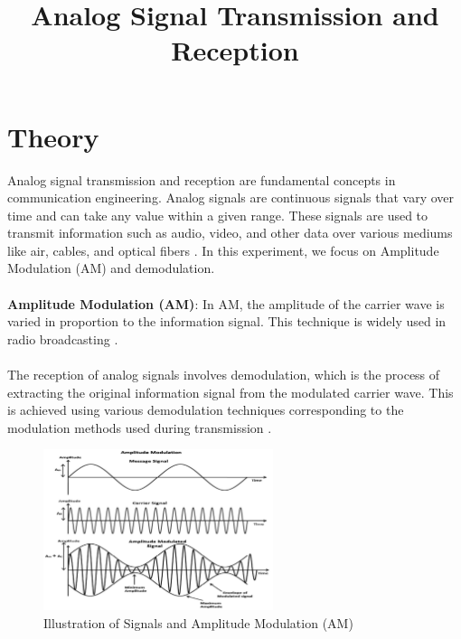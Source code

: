 \documentclass[12pt]{article}
\title{Analog Signal Transmission and Reception}
\author{}
\date{}
\begin{document}


\pagebreak

\tableofcontents

\pagebreak
{}
\maketitle

\section*{Theory}
Analog signal transmission and reception are fundamental concepts in communication engineering. Analog signals are continuous signals that vary over time and can take any value within a given range. These signals are used to transmit information such as audio, video, and other data over various mediums like air, cables, and optical fibers \cite{haykin2001communication}. In this experiment, we focus on Amplitude Modulation (AM) and demodulation.
\\\\
\textbf{Amplitude Modulation (AM)}: In AM, the amplitude of the carrier wave is varied in proportion to the information signal. This technique is widely used in radio broadcasting \cite{sklar2001digital}.
\\\\
The reception of analog signals involves demodulation, which is the process of extracting the original information signal from the modulated carrier wave. This is achieved using various demodulation techniques corresponding to the modulation methods used during transmission \cite{sklar2001digital}.

\begin{figure}[H]
    \centering
    \includegraphics[width=0.6\textwidth]{amMod.png}
    \caption{Illustration of Signals and Amplitude Modulation (AM)\cite{pic}}
    \label{fig:signals_am_mod}
\end{figure}
\end{document}
